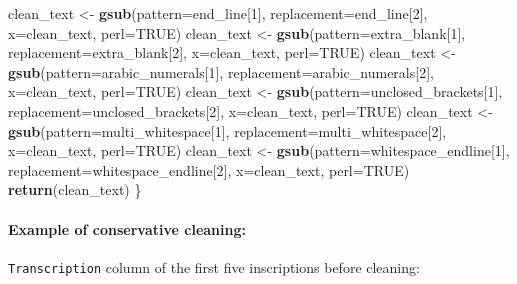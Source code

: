 \documentclass[]{article}
\newenvironment{Shaded}{\begin{snugshade}}{\end{snugshade}}
\newcommand{\DataTypeTok}[1]{\textcolor[rgb]{0.13,0.29,0.53}{#1}}
\newcommand{\DecValTok}[1]{\textcolor[rgb]{0.00,0.00,0.81}{#1}}
\newcommand{\KeywordTok}[1]{\textcolor[rgb]{0.13,0.29,0.53}{\textbf{#1}}}
\newcommand{\NormalTok}[1]{#1}
\newcommand{\OperatorTok}[1]{\textcolor[rgb]{0.81,0.36,0.00}{\textbf{#1}}}
\newcommand{\OtherTok}[1]{\textcolor[rgb]{0.56,0.35,0.01}{#1}}
\newcommand{\StringTok}[1]{\textcolor[rgb]{0.31,0.60,0.02}{#1}}
\let\oldparagraph\paragraph
\renewcommand{\paragraph}[1]{\oldparagraph{#1}\mbox{}}
\begin{document}
\begin{Shaded}
\begin{Highlighting}[]
\NormalTok{  clean_text <-}\StringTok{ }\KeywordTok{gsub}\NormalTok{(}\DataTypeTok{pattern=}\NormalTok{end_line[}\DecValTok{1}\NormalTok{], }\DataTypeTok{replacement=}\NormalTok{end_line[}\DecValTok{2}\NormalTok{], }\DataTypeTok{x=}\NormalTok{clean_text, }\DataTypeTok{perl=}\OtherTok{TRUE}\NormalTok{)}
\NormalTok{  clean_text <-}\StringTok{ }\KeywordTok{gsub}\NormalTok{(}\DataTypeTok{pattern=}\NormalTok{extra_blank[}\DecValTok{1}\NormalTok{], }\DataTypeTok{replacement=}\NormalTok{extra_blank[}\DecValTok{2}\NormalTok{], }\DataTypeTok{x=}\NormalTok{clean_text, }\DataTypeTok{perl=}\OtherTok{TRUE}\NormalTok{)}
\NormalTok{  clean_text <-}\StringTok{ }\KeywordTok{gsub}\NormalTok{(}\DataTypeTok{pattern=}\NormalTok{arabic_numerals[}\DecValTok{1}\NormalTok{], }\DataTypeTok{replacement=}\NormalTok{arabic_numerals[}\DecValTok{2}\NormalTok{], }\DataTypeTok{x=}\NormalTok{clean_text, }\DataTypeTok{perl=}\OtherTok{TRUE}\NormalTok{)}
\NormalTok{  clean_text <-}\StringTok{ }\KeywordTok{gsub}\NormalTok{(}\DataTypeTok{pattern=}\NormalTok{unclosed_brackets[}\DecValTok{1}\NormalTok{], }\DataTypeTok{replacement=}\NormalTok{unclosed_brackets[}\DecValTok{2}\NormalTok{], }\DataTypeTok{x=}\NormalTok{clean_text, }\DataTypeTok{perl=}\OtherTok{TRUE}\NormalTok{)}
\NormalTok{  clean_text <-}\StringTok{ }\KeywordTok{gsub}\NormalTok{(}\DataTypeTok{pattern=}\NormalTok{multi_whitespace[}\DecValTok{1}\NormalTok{], }\DataTypeTok{replacement=}\NormalTok{multi_whitespace[}\DecValTok{2}\NormalTok{], }\DataTypeTok{x=}\NormalTok{clean_text, }\DataTypeTok{perl=}\OtherTok{TRUE}\NormalTok{)}
\NormalTok{  clean_text <-}\StringTok{ }\KeywordTok{gsub}\NormalTok{(}\DataTypeTok{pattern=}\NormalTok{whitespace_endline[}\DecValTok{1}\NormalTok{], }\DataTypeTok{replacement=}\NormalTok{whitespace_endline[}\DecValTok{2}\NormalTok{], }\DataTypeTok{x=}\NormalTok{clean_text, }\DataTypeTok{perl=}\OtherTok{TRUE}\NormalTok{)}
  \KeywordTok{return}\NormalTok{(clean_text)}
\NormalTok{\}}
\end{Highlighting}
\end{Shaded}

\hypertarget{example-of-conservative-cleaning-1}{%
\paragraph{Example of conservative
cleaning:}\label{example-of-conservative-cleaning-1}}

\texttt{Transcription} column of the first five inscriptions before
cleaning:

\begin{Shaded}
\end{Shaded}
\end{document}
